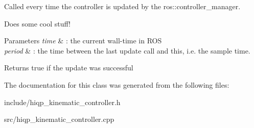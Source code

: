 Called every time the controller is updated by the ros\-::controller\-\_\-manager. 

Does some cool stuff!


\begin{DoxyParams}{Parameters}
{\em time} & \-: the current wall-\/time in R\-O\-S \\
\hline
{\em period} & \-: the time between the last update call and this, i.\-e. the sample time. \\
\hline
\end{DoxyParams}
\begin{DoxyReturn}{Returns}
true if the update was successful 
\end{DoxyReturn}


The documentation for this class was generated from the following files\-:\begin{DoxyCompactItemize}
\item 
include/hiqp\-\_\-kinematic\-\_\-controller.\-h\item 
src/hiqp\-\_\-kinematic\-\_\-controller.\-cpp\end{DoxyCompactItemize}
